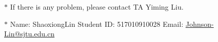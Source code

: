\documentclass[12pt,a4paper]{article}
\theoremstyle{definition}
\begin{document}
	
	\noindent
	
	\noindent{}
	\begin{center}
		\footnotesize{\color{red}$*$ If there is any problem, please contact TA Yiming Liu.}
		
		\footnotesize{\color{blue}$*$ Name: ShaoxiongLin  \quad Student ID: 517010910028 \quad Email: \href{mailto:Johnson-Lin@sjtu.edu.cn}{Johnson-Lin@sjtu.edu.cn}}
	\end{center}
	
\end{document}
